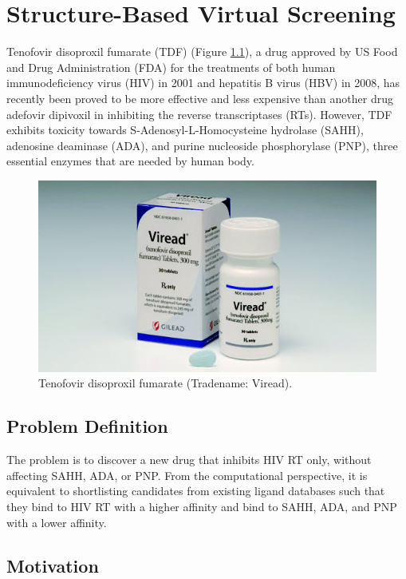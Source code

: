 \chapter{Structure-Based Virtual Screening}

Tenofovir disoproxil fumarate (TDF) (Figure \ref{fig:Viread}), a drug approved by US Food and Drug Administration (FDA) for the treatments of both human immunodeficiency virus (HIV) in 2001 and hepatitis B virus (HBV) in 2008, has recently been proved to be more effective and less expensive than another drug adefovir dipivoxil in inhibiting the reverse transcriptases (RTs). However, TDF exhibits toxicity towards S-Adenosyl-L-Homocysteine hydrolase (SAHH), adenosine deaminase (ADA), and purine nucleoside phosphorylase (PNP), three essential enzymes that are needed by human body.

\begin{figure}
\centering
\includegraphics[width=\textwidth]{VirtualScreening/Figures/Viread.jpg}
\caption{Tenofovir disoproxil fumarate (Tradename: Viread).}
\label{fig:Viread}
\end{figure}

\section{Problem Definition}

The problem is to discover a new drug that inhibits HIV RT only, without affecting SAHH, ADA, or PNP. From the computational perspective, it is equivalent to shortlisting candidates from existing ligand databases such that they bind to HIV RT with a higher affinity and bind to SAHH, ADA, and PNP with a lower affinity.

\section{Motivation}


